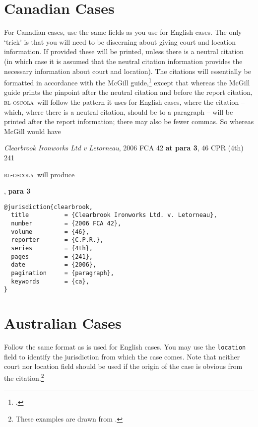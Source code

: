 \documentclass[a4paper,
               11pt,
	       DIV=1,			   
	       footinclude=false]
	      {scrartcl}
\newcommand{\oscola}{\textsc{bl-oscola}}
\newcounter{egcounter}\setcounter{egcounter}{0}
\newlength{\boxwidth}
\newenvironment{bibexample}[1][]
{%
  \medskip\par\noindent\ignorespaces
  \marginpar{[\refstepcounter{egcounter}\arabic{egcounter}]\label{#1}}%
  \setlength{\boxwidth}{0.95\linewidth}%
  \addtolength{\boxwidth}{-2\fboxsep}
  \addtolength{\boxwidth}{-2\fboxrule}
  \begin{lrbox}{\boxcontainer}
  \begin{minipage}[t]{\boxwidth}%
}
{%
  \end{minipage}\end{lrbox}%
  \colorbox{gray!30}{\usebox{\boxcontainer}}
  \par\medskip}
\begin{document}
\section{Canadian Cases}

For Canadian cases, use the same fields as you use for English
cases. The only `trick' is that you will need to be discerning about
giving court and location information. If provided these will be
printed, unless there is a neutral citation (in which case it is
assumed that the neutral citation information provides the necessary
information about court and location). The citations will essentially
be formatted in accordance with the McGill
guide,\footcite{mcgill:guide} except that whereas the McGill guide
prints the pinpoint after the neutral citation and before the report
citation, \oscola\ will follow the pattern it uses for English cases,
where the citation -- which, where there is a neutral citation, should
be to a paragraph -- will be printed after the report information;
there may also be fewer commas. So whereas McGill would
have \begin{center} \emph{Clearbrook Ironworks Ltd v Letorneau}, 2006
  FCA 42 \textbf{at para 3}, 46 CPR (4th) 241
\end{center} \oscola\ will produce \begin{center} \cite{clearbrook}, \textbf{para 3}
\end{center}

\begin{bibexample}[clearbrook]
\begin{verbatim}
@jurisdiction{clearbrook,
  title          = {Clearbrook Ironworks Ltd. v. Letorneau},
  number         = {2006 FCA 42},
  volume         = {46},
  reporter       = {C.P.R.},
  series         = {4th},
  pages          = {241},
  date           = {2006},
  pagination     = {paragraph},
  keywords       = {ca},
}
\end{verbatim}
\end{bibexample}

\section{Australian Cases}

Follow the same format as is used for English cases. You may use the \verb|location| field to identify the jurisdiction
from which the case comes. Note that neither court nor location
field should be used if the origin of the case is obvious from the
citation.\footnote{These examples are drawn from \cite[37]{melbourne}.}
\end{document}
